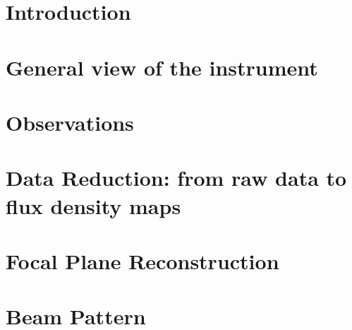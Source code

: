 \documentclass[traditionalabstract]{aa}
\begin{document}
\section{Introduction}
\label{se:intro}



\section{General view of the instrument}
\label{se:instru}



\section{Observations}
\label{se:observations}



\section{Data Reduction: from raw data to flux density maps}
\label{se:dataproc}


\section{Focal Plane Reconstruction}
\label{se:geometry}


\section{Beam Pattern}
\label{se:beam}

\end{document}
